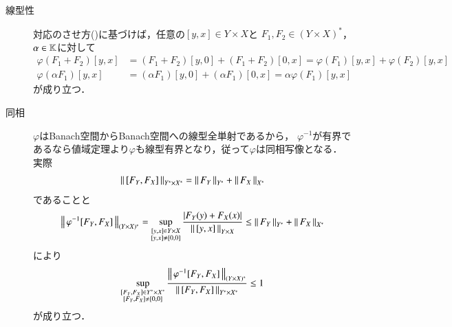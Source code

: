 	\begin{prf}\mbox{}
		\begin{description}
			\item[線型性]
				対応のさせ方()に基づけば，任意の$[y,x] \in Y \times X$と
				$F_1,F_2 \in (Y \times X)^*$，$\alpha \in \mathbb{K}$に対して
				\begin{align}
					\varphi(F_1 + F_2)[y,x] &= (F_1 + F_2)[y,0] + (F_1 + F_2)[0,x] = \varphi(F_1)[y,x] + \varphi(F_2)[y,x]　\\
					\varphi(\alpha F_1)[y,x] &= (\alpha F_1)[y,0] + (\alpha F_1)[0,x] = \alpha \varphi(F_1)[y,x]
				\end{align}
				が成り立つ．
			
			\item[同相] $\varphi$はBanach空間からBanach空間への線型全単射であるから，
				$\varphi^{-1}$が有界であるなら値域定理より$\varphi$も線型有界となり，従って$\varphi$は同相写像となる．
				実際
				\begin{align}
					\left\|\, [F_Y,F_X]\, \right\|_{Y^* \times X^*} = \left\|\, F_Y\, \right\|_{Y^*} + \left\|\, F_X\, \right\|_{X^*}
				\end{align}
				であることと
				\begin{align}
					\left\|\, \varphi^{-1}[F_Y,F_X]\, \right\|_{(Y \times X)^*}
					= \operatorname*{sup}_{\substack{[y,x] \in Y \times X \\ [y,x] \neq [0,0]}} \frac{|F_Y(y) + F_X(x)|}{\left\|\, [y,x]\, \right\|_{Y \times X}}
					\leq \left\|\, F_Y\, \right\|_{Y^*} + \left\|\, F_X\, \right\|_{X^*}
				\end{align}
				により
				\begin{align}
					\operatorname*{sup}_{\substack{[F_Y,F_X] \in Y^* \times X^* \\ [F_Y,F_X] \neq [0,0]}} \frac{\left\|\, \varphi^{-1}[F_Y,F_X]\, \right\|_{(Y \times X)^*}}{\left\|\, [F_Y,F_X]\, \right\|_{Y^* \times X^*}}
					\leq 1
				\end{align}
				が成り立つ．
		\end{description}
		\QED
	\end{prf}
	
